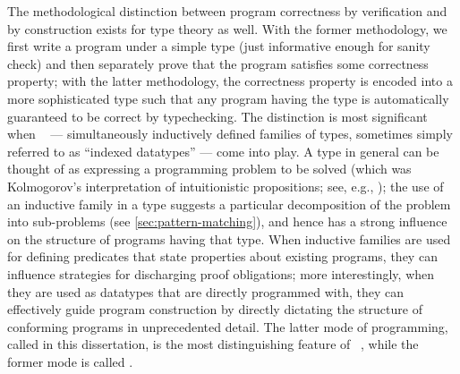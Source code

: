 The methodological distinction between program correctness by verification and by construction exists for type theory as well.
With the former methodology, we first write a program under a simple type (just informative enough for sanity check) and then separately prove that the program satisfies some correctness property; with the latter methodology, the correctness property is encoded into a more sophisticated type such that any program having the type is automatically guaranteed to be correct by typechecking.
The distinction is most significant when ~\citep{Dybjer-inductive-families} --- simultaneously inductively defined families of types, sometimes simply referred to as ``indexed datatypes'' --- come into play.
A type in general can be thought of as expressing a programming problem to be solved (which was Kolmogorov's interpretation of intuitionistic propositions; see, e.g., \citet{ML-truth-of-a-proposition}); the use of an inductive family in a type suggests a particular decomposition of the problem into sub-problems (see \autoref{sec:pattern-matching}), and hence has a strong influence on the structure of programs having that type.
When inductive families are used for defining predicates that state properties about existing programs, they can influence strategies for discharging proof obligations; more interestingly, when they are used as datatypes that are directly programmed with, they can effectively guide program construction by directly dictating the structure of conforming programs in unprecedented detail.
The latter mode of programming, called  in this dissertation, is the most distinguishing feature of ~\citep{McBride-Epigram, Altenkirch-why-dependent-types-matter}, while the former mode is called .

